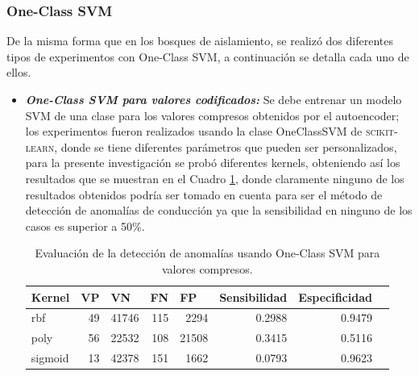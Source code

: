 \subsubsection{One-Class SVM}

De la misma forma que en los bosques de aislamiento, se realiz\'{o} dos diferentes tipos de experimentos con One-Class SVM, a continuaci\'{o}n se detalla cada uno de ellos.

\begin{itemize}
\item \textbf{\textit{One-Class SVM para valores codificados: }}Se debe entrenar un modelo SVM de una clase para los valores compresos obtenidos por el autoencoder; los experimentos fueron realizados usando la clase OneClassSVM de \textsc{scikit-learn}, donde se tiene diferentes par\'{a}metros que pueden ser personalizados, para la presente investigaci\'{o}n se prob\'{o} diferentes kernels, obteniendo as\'{i} los resultados que se muestran en el Cuadro \ref{table:evaluacion_SVM_encoded}, donde claramente ninguno de los resultados obtenidos podr\'{i}a ser tomado en cuenta para ser el m\'{e}todo de detecci\'{o}n de anomal\'{i}as de conducci\'{o}n ya que la sensibilidad en ninguno de los casos es superior a 50\%.

\begin{table}[H]
\centering
\begin{center}
\begin{tabular}{|l|r|r|r|r|r|r|r|}
\hline
\textbf{Kernel} & \multicolumn{1}{l|}{\textbf{VP}} & \multicolumn{1}{l|}{\textbf{VN}}& \multicolumn{1}{l|}{\textbf{FN}}& \multicolumn{1}{l|}{\textbf{FP}} & \multicolumn{1}{l|}{\textbf{Sensibilidad}} & \multicolumn{1}{l|}{\textbf{Especificidad}} \\ \hline
rbf & \cellcolor[HTML]{AADD99} 49 & \cellcolor[HTML]{AADD99} 41746 & \cellcolor[HTML]{FFCE93} 115 & \cellcolor[HTML]{FFCE93} 2294 & 0.2988 & 0.9479 \\ \hline
poly & \cellcolor[HTML]{AADD99} 56 & \cellcolor[HTML]{AADD99} 22532 & \cellcolor[HTML]{FFCE93} 108 & \cellcolor[HTML]{FFCE93} 21508 & 0.3415 & 0.5116 \\ \hline
sigmoid & \cellcolor[HTML]{AADD99} 13 & \cellcolor[HTML]{AADD99} 42378 & \cellcolor[HTML]{FFCE93} 151 & \cellcolor[HTML]{FFCE93} 1662 & 0.0793 & 0.9623 \\ \hline
\end{tabular}
\end{center}
\caption{Evaluaci\'{o}n de la detecci\'{o}n de anomal\'{i}as usando One-Class SVM para valores compresos.}
\label{table:evaluacion_SVM_encoded}
\end{table}


\end{itemize}
